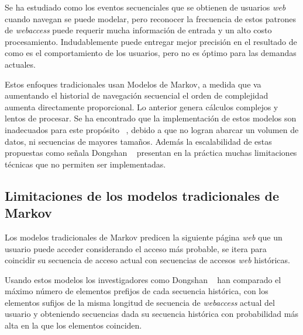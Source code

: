%
 

Se ha estudiado como los eventos secuenciales que se obtienen de usuarios \emph{web} cuando navegan se puede modelar, pero reconocer la frecuencia de estos patrones de \emph{webaccess} puede requerir mucha  información de entrada y un alto costo procesamiento.  Indudablemente puede entregar mejor precisión en el resultado de como es el comportamiento de los usuarios, pero no es óptimo para las demandas actuales. 

Estos enfoques tradicionales usan Modelos de Markov, a medida que va aumentando el historial de navegación secuencial el orden de complejidad aumenta directamente proporcional. Lo anterior genera cálculos  complejos y lentos de procesar. Se ha encontrado que la implementación de estos modelos son inadecuados para este propósito~\cite{Dongshan2002} , debido a que no logran abarcar un volumen de datos, ni secuencias de mayores tamaños. Además la escalabilidad de estas propuestas  como señala Dongshan \etal~\cite{Dongshan2002} presentan en la práctica muchas limitaciones técnicas que no permiten ser implementadas. 


 





 
 
 \subsection{Limitaciones de los modelos tradicionales de Markov}
 
 Los modelos tradicionales de Markov predicen la siguiente página \emph{web} que un usuario puede acceder considerando el acceso más probable, se itera para  coincidir su secuencia de acceso actual con secuencias de accesos \emph{web} históricas.
 
 Usando estos modelos los investigadores como  Dongshan \etal~\cite{Dongshan2002} han comparado  el máximo número de elementos  prefijos de cada secuencia histórica,  con los elementos sufijos de la  misma longitud de secuencia de \emph{webaccess} actual del usuario y obteniendo secuencias dada su secuencia histórica con probabilidad más alta en la que los elementos coinciden.
 
